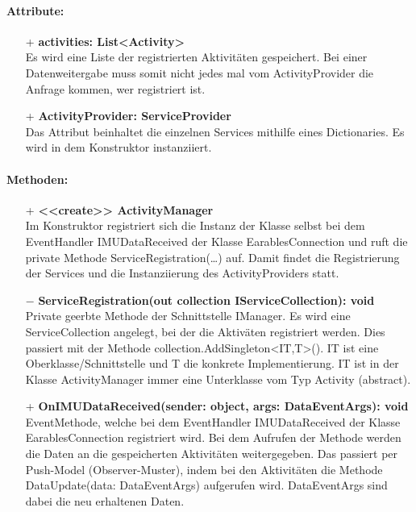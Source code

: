 \documentclass[a4paper,12pt]{article}
\begin{document}
	\paragraph{Attribute:}
	\begin{itemize}
		\item[+] \textbf{activities: List<Activity>}\\Es wird eine Liste der registrierten Aktivitäten gespeichert. Bei einer Datenweitergabe muss somit nicht jedes mal vom ActivityProvider die Anfrage kommen, wer registriert ist. 
		\item[+] \textbf{ActivityProvider: ServiceProvider}\\Das Attribut beinhaltet die einzelnen Services mithilfe eines Dictionaries. Es wird in dem Konstruktor instanziiert.
	\end{itemize}
	\paragraph{Methoden:}
	\begin{itemize}
		\item[+] \textbf{<<create>> ActivityManager}\\Im Konstruktor registriert sich die Instanz der Klasse selbst bei dem EventHandler IMUDataReceived der Klasse EarablesConnection und ruft die private Methode ServiceRegistration(\dots) auf. Damit findet die Registrierung der Services und die Instanziierung des ActivityProviders statt.
		\item[$-$] \textbf{ServiceRegistration(out collection IServiceCollection): void}\\Private geerbte Methode der Schnittstelle IManager. Es wird eine ServiceCollection angelegt, bei der die Aktiväten registriert werden. Dies passiert mit der Methode collection.AddSingleton<IT,T>(). IT ist eine Oberklasse/Schnittstelle und T die konkrete Implementierung. IT ist in der Klasse ActivityManager immer eine Unterklasse vom Typ Activity (abstract).
		\item[+] \textbf{OnIMUDataReceived(sender: object, args: DataEventArgs): void}\\EventMethode, welche bei dem EventHandler IMUDataReceived der Klasse EarablesConnection registriert wird. Bei dem Aufrufen der Methode werden die Daten an die gespeicherten Aktivitäten weitergegeben. Das passiert per Push-Model (Observer-Muster), indem bei den Aktivitäten die Methode DataUpdate(data: DataEventArgs) aufgerufen wird. DataEventArgs sind dabei die neu erhaltenen Daten.\\

	\end{itemize}
	
\end{document}
